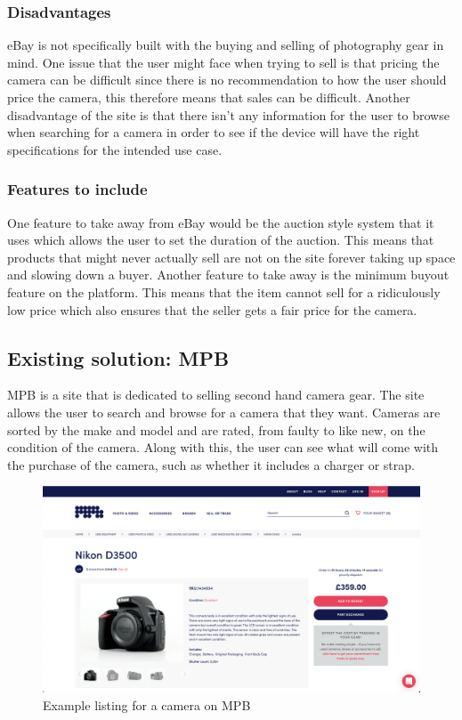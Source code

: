 \subsubsection{Disadvantages}
eBay is not specifically built with the buying and selling of photography gear in mind. One issue that the user might face when trying to sell is that pricing the camera can be difficult since there is no recommendation to how the user should price the camera, this therefore means that sales can be difficult. Another disadvantage of the site is that there isn’t any information for the user to browse when searching for a camera in order to see if the device will have the right specifications for the intended use case.
\subsubsection{Features to include}
One feature to take away from eBay would be the auction style system that it uses which allows the user to set the duration of the auction. This means that products that might never actually sell are not on the site forever taking up space and slowing down a buyer. Another feature to take away is the minimum buyout feature on the platform. This means that the item cannot sell for a ridiculously low price which also ensures that the seller gets a fair price for the camera. 

\subsection{Existing solution: MPB \parencite{mpb}}
MPB is a site that is dedicated to selling second hand camera gear. The site allows the user to search and browse for a camera that they want. Cameras are sorted by the make and model and are rated, from faulty to like new, on the condition of the camera. Along with this, the user can see what will come with the purchase of the camera, such as whether it includes a charger or strap.
\begin{figure}[H]
    \centering
    \includegraphics[scale=0.27]{ch1_analysis/mpb_listing.png}
    \caption{Example listing for a camera on MPB}
    \label{fig:ch1_mpb}
\end{figure}
